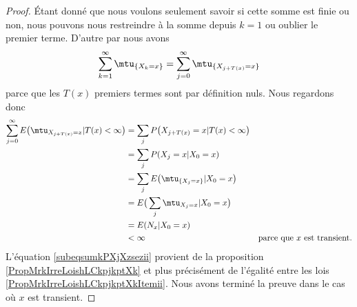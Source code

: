 \begin{proof}
    Étant donné que nous voulons seulement savoir si cette somme est finie ou non, nous pouvons nous restreindre à la somme depuis \( k=1\) ou oublier le premier terme. D'autre par nous avons
    \begin{equation}
        \sum_{k=1}^{\infty}\mtu_{\{ X_k=x \}}=\sum_{j=0}^{\infty}\mtu_{\{ X_{j+T(x)}=x \}}
    \end{equation}
    parce que les \( T(x)\) premiers termes sont par définition nuls. Nous regardons donc
    \begin{subequations}
        \begin{align}
            \sum_{j=0}^{\infty}E\big( \mtu_{X_{j+T(x)}=x}|T(x)<\infty \big)&=\sum_{j}P\big( X_{j+T(x)}=x|T(x)<\infty \big)\\
            &=\sum_jP(X_j=x|X_0=x)  \label{subeqsumkPXjXzsezii}\\
            &=\sum_jE\big( \mtu_{\{ X_j=x \}}|X_0=x \big)\\
            &=E\big( \sum_j\mtu_{X_j=x}|X_0=x \big)\\
            &=E(N_x|X_0=x)\\
            &<\infty    &\text{parce que } x\text{ est transient.}
        \end{align}
    \end{subequations}
    L'équation \eqref{subeqsumkPXjXzsezii} provient de la proposition \ref{PropMrkIrreLoishLCkpjkptXk} et plus précisément de l'égalité entre les lois \eqref{PropMrkIrreLoishLCkpjkptXkItemii}. Nous avons terminé la preuve dans le cas où \( x\) est transient.


\end{proof}
